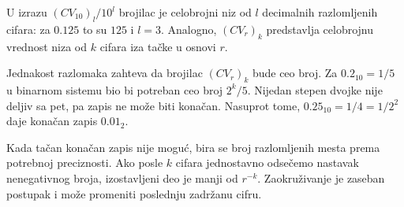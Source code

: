 
U izrazu $(CV_{10})_l/10^l$ brojilac je celobrojni niz od $l$ decimalnih razlomljenih cifara: za $0.125$ to su $125$ i $l=3$. Analogno, $(CV_r)_k$ predstavlja celobrojnu vrednost niza od $k$ cifara iza tačke u osnovi $r$.

Jednakost razlomaka zahteva da brojilac $(CV_r)_k$ bude ceo broj. Za $0.2_{10}=1/5$ u binarnom sistemu bio bi potreban ceo broj $2^k/5$. Nijedan stepen dvojke nije deljiv sa pet, pa zapis ne može biti konačan. Nasuprot tome, $0.25_{10}=1/4=1/2^2$ daje konačan zapis $0.01_2$.

Kada tačan konačan zapis nije moguć, bira se broj razlomljenih mesta prema potrebnoj preciznosti. Ako posle $k$ cifara jednostavno odsečemo nastavak nenegativnog broja, izostavljeni deo je manji od $r^{-k}$. Zaokruživanje je zaseban postupak i može promeniti poslednju zadržanu cifru.
